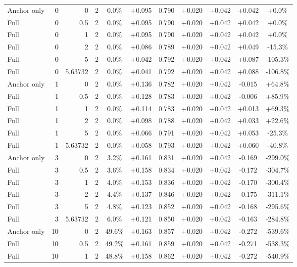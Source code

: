 \begin{table}[htbp]
\begin{tabular}{lrrrccccccc}
Anchor only & 0 & 0 & 2 & 0.0\% & +0.095 & 0.790 & +0.020 & +0.042 & +0.042 & +0.0\% \\
Full & 0 & 0.5 & 2 & 0.0\% & +0.095 & 0.790 & +0.020 & +0.042 & +0.042 & +0.0\% \\
Full & 0 & 1 & 2 & 0.0\% & +0.095 & 0.790 & +0.020 & +0.042 & +0.042 & +0.0\% \\
Full & 0 & 2 & 2 & 0.0\% & +0.086 & 0.789 & +0.020 & +0.042 & +0.049 & -15.3\% \\
Full & 0 & 5 & 2 & 0.0\% & +0.042 & 0.792 & +0.020 & +0.042 & +0.087 & -105.3\% \\
Full & 0 & 5.63732 & 2 & 0.0\% & +0.041 & 0.792 & +0.020 & +0.042 & +0.088 & -106.8\% \\
Anchor only & 1 & 0 & 2 & 0.0\% & +0.136 & 0.782 & +0.020 & +0.042 & -0.015 & +64.8\% \\
Full & 1 & 0.5 & 2 & 0.0\% & +0.128 & 0.783 & +0.020 & +0.042 & -0.006 & +85.9\% \\
Full & 1 & 1 & 2 & 0.0\% & +0.114 & 0.783 & +0.020 & +0.042 & +0.013 & +69.3\% \\
Full & 1 & 2 & 2 & 0.0\% & +0.098 & 0.788 & +0.020 & +0.042 & +0.033 & +22.6\% \\
Full & 1 & 5 & 2 & 0.0\% & +0.066 & 0.791 & +0.020 & +0.042 & +0.053 & -25.3\% \\
Full & 1 & 5.63732 & 2 & 0.0\% & +0.058 & 0.793 & +0.020 & +0.042 & +0.060 & -40.8\% \\
Anchor only & 3 & 0 & 2 & 3.2\% & +0.161 & 0.831 & +0.020 & +0.042 & -0.169 & -299.0\% \\
Full & 3 & 0.5 & 2 & 3.6\% & +0.158 & 0.834 & +0.020 & +0.042 & -0.172 & -304.7\% \\
Full & 3 & 1 & 2 & 4.0\% & +0.153 & 0.836 & +0.020 & +0.042 & -0.170 & -300.4\% \\
Full & 3 & 2 & 2 & 4.4\% & +0.137 & 0.846 & +0.020 & +0.042 & -0.175 & -311.1\% \\
Full & 3 & 5 & 2 & 4.8\% & +0.123 & 0.852 & +0.020 & +0.042 & -0.168 & -295.6\% \\
Full & 3 & 5.63732 & 2 & 6.0\% & +0.121 & 0.850 & +0.020 & +0.042 & -0.163 & -284.8\% \\
Anchor only & 10 & 0 & 2 & 49.6\% & +0.163 & 0.857 & +0.020 & +0.042 & -0.272 & -539.6\% \\
Full & 10 & 0.5 & 2 & 49.2\% & +0.161 & 0.859 & +0.020 & +0.042 & -0.271 & -538.3\% \\
Full & 10 & 1 & 2 & 48.8\% & +0.158 & 0.862 & +0.020 & +0.042 & -0.272 & -540.9\% \\

\end{tabular}
\end{table}
